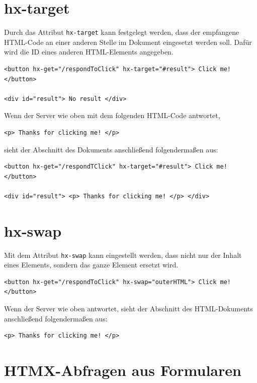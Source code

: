 \documentclass[a4paper]{scrartcl}
\begin{document}
\section{hx-target}\label{sec:hx-target}


Durch das Attribut \texttt{hx-target} kann festgelegt werden, dass der empfangene HTML-Code an einer anderen Stelle im Dokument eingesetzt werden soll.
Dafür wird die ID eines anderen HTML-Elements angegeben.

\begin{verbatim}
<button hx-get="/respondToClick" hx-target="#result"> Click me! </button>

<div id="result"> No result </div>
\end{verbatim}

Wenn der Server wie oben mit dem folgenden HTML-Code antwortet,
\begin{verbatim}
<p> Thanks for clicking me! </p>
\end{verbatim}



sieht der Abschnitt des Dokuments anschließend folgendermaßen aus:

\begin{verbatim}
<button hx-get="/respondTClick" hx-target="#result"> Click me! </button>

<div id="result"> <p> Thanks for clicking me! </p> </div>
\end{verbatim}

\section{hx-swap}\label{sec:hx-swap}


Mit dem Attribut \texttt{hx-swap} kann eingestellt werden, dass nicht nur der Inhalt eines Elements, sondern das ganze Element ersetzt wird.

\begin{verbatim}
<button hx-get="/respondToClick" hx-swap="outerHTML"> Click me! </button>
\end{verbatim}

Wenn der Server wie oben antwortet, sieht der Abschnitt des HTML-Dokuments anschließend folgendermaßen aus:
\begin{verbatim}
<p> Thanks for clicking me! </p>
\end{verbatim}


\section{HTMX-Abfragen aus Formularen}\label{sec:htmx-abfragen-aus-formularen}
\end{document}
